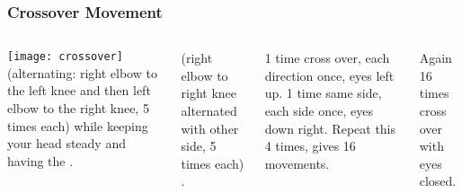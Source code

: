 \documentclass[../main.tex]{subfiles}
\begin{document}
\begin{frame}
\frametitle{Crossover Movement}


\begin{columns}[c] %

\texttt{[image: crossover]}
\textbf{} (alternating: right elbow to the left knee and then left elbow to the right knee, 5 times each) while keeping your head steady and having the . 

\textbf{} (right elbow to right knee alternated with other side, 5 times each) . 

\textbf{} 1 time cross over, each direction once, eyes left up. 1 time same side, each side once, eyes down right. Repeat this 4 times, gives 16 movements. 
 
\textbf{} Again 16 times cross over with eyes closed.

\end{columns}
\end{frame}
\end{document}

